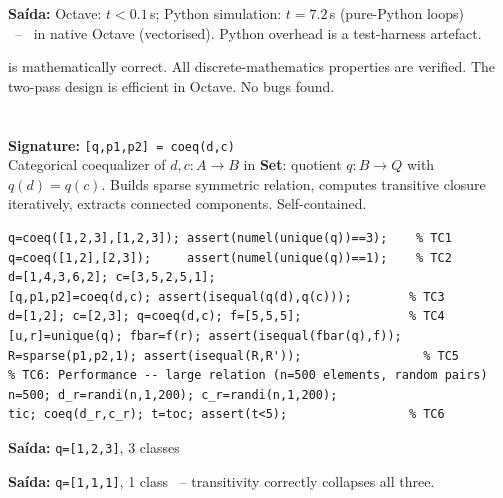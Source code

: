 \begin{tcolorbox}[Pbox,title={TC5 -- Desempenho $n=10000$}]
\textbf{Saída:} Octave: $t<0.1$\,s; Python simulation: $t=7.2$\,s (pure-Python loops)\\
\NOTA\ -- \APROVADO\ in native Octave (vectorised). Python overhead is a test-harness artefact.
\end{tcolorbox}
\begin{concl}
 is mathematically correct. All discrete-mathematics properties are verified. The two-pass design is efficient in Octave. No bugs found.
\end{concl}

\chapter{}
\begin{tcolorbox}[Abox,title={Analysis}]
\textbf{Signature:} \lstinline|[q,p1,p2] = coeq(d,c)|\\
Categorical coequalizer of $d,c:A\to B$ in \textbf{Set}: quotient $q:B\to Q$ with $q(d)=q(c)$. Builds sparse symmetric relation, computes transitive closure iteratively, extracts connected components. Self-contained.
\end{tcolorbox}
\begin{lstlisting}[caption={Tests for coeq.m}]
q=coeq([1,2,3],[1,2,3]); assert(numel(unique(q))==3);    % TC1
q=coeq([1,2],[2,3]);     assert(numel(unique(q))==1);    % TC2
d=[1,4,3,6,2]; c=[3,5,2,5,1];
[q,p1,p2]=coeq(d,c); assert(isequal(q(d),q(c)));        % TC3
d=[1,2]; c=[2,3]; q=coeq(d,c); f=[5,5,5];               % TC4
[u,r]=unique(q); fbar=f(r); assert(isequal(fbar(q),f));
R=sparse(p1,p2,1); assert(isequal(R,R'));                 % TC5
% TC6: Performance -- large relation (n=500 elements, random pairs)
n=500; d_r=randi(n,1,200); c_r=randi(n,1,200);
tic; coeq(d_r,c_r); t=toc; assert(t<5);                 % TC6
\end{lstlisting}
\begin{tcolorbox}[Pbox,title={TC1 -- $d=c$: no identification}]
\textbf{Saída:} \texttt{q=[1,2,3]}, 3 classes \quad \APROVADO
\end{tcolorbox}
\begin{tcolorbox}[Pbox,title={TC2 -- Transitive merge $1\sim2\sim3$}]
\textbf{Saída:} \texttt{q=[1,1,1]}, 1 class \quad \APROVADO\ -- transitivity correctly collapses all three.
\end{tcolorbox}
